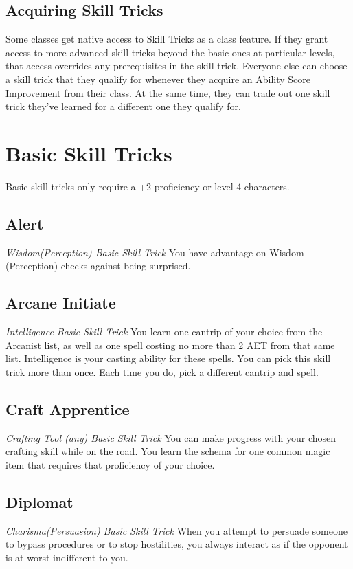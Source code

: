 \subsection{Acquiring Skill Tricks}
\label{subsec:acquiring-skill-tricks}

Some classes get native access to Skill Tricks as a class feature. If they grant access to more advanced skill tricks beyond the basic ones at particular levels, that access overrides any prerequisites in the skill trick. Everyone else can choose a skill trick that they qualify for whenever they acquire an Ability Score Improvement from their class. At the same time, they can trade out one skill trick they've learned for a different one they qualify for.

\section{Basic Skill Tricks}
\label{sec:skill-tricks-basic}

Basic skill tricks only require a +2 proficiency or level 4 characters.

\subsection{Alert}\label{st:alert}
\textit{Wisdom(Perception) Basic Skill Trick}
You have advantage on Wisdom (Perception) checks against being surprised.

\subsection{Arcane Initiate}
\textit{Intelligence Basic Skill Trick}
You learn one cantrip of your choice from the Arcanist list, as well as one spell costing no more than 2 AET from that same list. Intelligence is your casting ability for these spells. You can pick this skill trick more than once. Each time you do, pick a different cantrip and spell.

\subsection{Craft Apprentice}\label{st:craft-apprentice}
\textit{Crafting Tool (any) Basic Skill Trick}
You can make progress with your chosen crafting skill while on the road. You learn the schema for one common magic item that requires that proficiency of your choice.

\subsection{Diplomat}\label{st:diplomat}
\textit{Charisma(Persuasion) Basic Skill Trick}
When you attempt to persuade someone to bypass procedures or to stop hostilities, you always interact as if the opponent is at worst indifferent to you.

